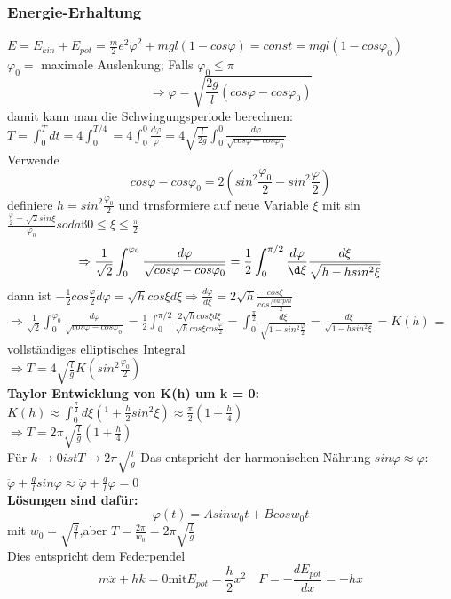 \documentclass[11pt]{article}
\begin{document}
						\subsubsection{Energie-Erhaltung}
							\quad$ E = E_{kin} + E_{pot} = \frac{m}{2} e^2 \dot{\varphi}^2 + mgl(1 - cos \varphi)= const = mgl(1 - cos \varphi_0) $\\
							$ \varphi_0 =$ maximale Auslenkung; Falls $\varphi_0 \leq \pi$\\
							\[ \Rightarrow \dot{\varphi} = \sqrt{\frac{2g}{l}(cos \varphi - cos \varphi_0) } \]
							damit kann man die Schwingungsperiode berechnen:\\
							$T = \int_{0}^{T}dt = 4 \int_{0}^{T/4} = 4 \int_{0}^{0} \frac{d\varphi}{\dot{\varphi}} = 4 \sqrt{\frac{l}{2g}} \int_{0}^{0} \frac{d\varphi}{\sqrt{cos \varphi - cos \varphi_0}} $\\
							Verwende 
							\[ cos \varphi - cos \varphi_0 = 2(sin^2\frac{\varphi_0}{2} - sin^2 \frac{\varphi}{2}) \]
							definiere $h = sin^2 \frac{\varphi_0}{2}$ und trnsformiere auf neue Variable $\xi$ mit  sin $\frac{\frac{\varphi}{2} = \sqrt{2} sin \xi}{\varphi_0} so daß 0 \leq \xi \leq \frac{\pi}{2}$
							\[ \Rightarrow \frac{1}{\sqrt{2}} \int_{0}^{\varphi_0} \frac{d\varphi}{\sqrt{cos \varphi - cos \varphi_0}} = \frac{1}{2} \int_{0}^{\pi/2} \frac{d \varphi}{\d \xi} \frac{d \xi}{\sqrt{h - h sin^2\xi}} \]
							dann ist $-\frac{1}{2} cos \frac{\varphi}{2} d\varphi = \sqrt{h} cos \xi d \xi \Rightarrow \frac{d \varphi}{d \xi} = 2 \sqrt{h} \frac{cos \xi}{cos \frac{/varphi}{2}}$\\
							$ \Rightarrow \frac{1}{\sqrt{2}} \int_{0}^{\varphi_0} \frac{d \varphi}{\sqrt{cos \varphi - cos \varphi_0}} = \frac{1}{2} \int_{0}^{\pi/2} \frac{2 \sqrt{h} cos \xi d\xi}{\sqrt{h} cos \xi cos \frac{\varphi}{2}} = \int_{0}^{\frac{\pi}{2}} \frac{d \xi}{\sqrt{1 - sin^2 \frac{\varphi}{2}}} = \frac{d \xi}{\sqrt{1 -h sin^2\xi}} = K(h)$ = vollständiges elliptisches Integral \\
							$ \Rightarrow T= 4 \sqrt{\frac{l}{g}} K(sin^2 \frac{\varphi_0}{2}) $\\
							\textbf{Taylor Entwicklung von K(h) um k = 0:}\\
								$K(h) \approx \int_{0}^{\frac{\pi}{2}} d\xi (^1 + \frac{h}{2} sin^2 \xi) \approx \frac{\pi}{2}(1+\frac{h}{4})$\\
								$ \Rightarrow T = 2\pi \sqrt{\frac{l}{g}}(1 +  \frac{h}{4}) $\\
								Für $k \rightarrow 0 ist T \rightarrow 2\pi \sqrt{\frac{l}{g}}$ Das entspricht der harmonischen Nährung $sin \varphi \approx \varphi$:\\
								$\ddot{\varphi} + \frac{g}{l} sin \varphi \approx \ddot{\varphi} + \frac{g}{l} \varphi = 0 $\\
								\textbf{Lösungen sind dafür:}
									\[ \varphi(t) = A sin w_0 t + B cos w_0 t \]
									mit $w_0 =\sqrt{\frac{g}{l}}$,aber $T = \frac{2 \pi}{w_0} = 2\pi \sqrt{\frac{l}{g}}$\\
									Dies entspricht dem Federpendel
									\[ m \ddot{x} + hk = 0 \text{mit} E_{pot} = \frac{h}{2}x^2 \quad F = - \frac{d E_{pot}}{dx} = - hx \] 
\end{document}
